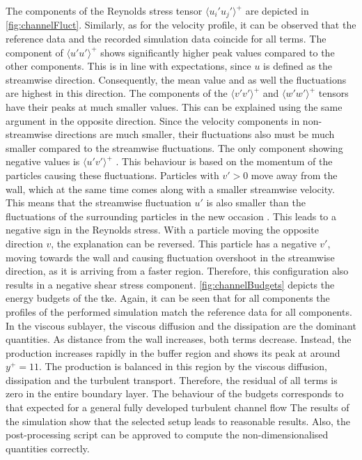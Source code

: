 The components of the Reynolds stress tensor $\langle u_i'u_j'\rangle ^+$ are depicted in \autoref{fig:channelFluct}.
Similarly, as for the velocity profile, it can be observed that the reference data and the recorded simulation data coincide for all terms.
The component of $\langle u'u'\rangle ^+$ shows  significantly higher peak values compared to the other components.
This is in line with expectations,  since $u$ is defined as the streamwise direction.
Consequently,  the mean value and as well the fluctuations are highest in this direction.
The components of the $\langle v'v'\rangle ^+$ and $\langle w'w'\rangle ^+$ tensors have their peaks at much smaller values.
%
This can be explained using the same argument in the opposite direction.
Since the velocity components in non-streamwise directions are much smaller, their fluctuations also must be much smaller compared to the streamwise fluctuations.
The only component showing negative values is $\langle u'v'\rangle ^+$  .
This behaviour is based on the momentum of the particles causing these fluctuations.
Particles with $v' > 0$ move away from the wall, which at the same time comes along with a smaller streamwise velocity. This means that the streamwise fluctuation $u'$ is also  smaller than the fluctuations of the surrounding particles in the new occasion .
This leads to a negative sign in the Reynolds stress.
With a particle moving the opposite direction $v$, the explanation can be reversed.
This particle has a negative $v'$, moving towards the wall and causing  fluctuation overshoot in the streamwise direction, as it is arriving from a faster region. 
Therefore, this configuration also results in a negative shear stress component.
\autoref{fig:channelBudgets} depicts the energy budgets of the \acrshort{tke}.
Again, it can be seen that for all components the profiles of the performed simulation match the reference data for all components.
In the viscous sublayer, the viscous diffusion and the dissipation are the dominant quantities.
As distance from the wall increases, both terms decrease.
Instead, the production increases rapidly in the buffer region and shows its peak at around $y ^+ = 11$.
The production is balanced in this region by the viscous diffusion, dissipation and the turbulent transport.
Therefore, the residual of all terms is zero in the entire boundary layer.
The behaviour of the budgets corresponds to that expected  for a general fully developed turbulent channel flow 
The results  of the simulation show that the selected setup leads to reasonable results.
Also, the post-processing script can be approved to compute the non-dimensionalised quantities correctly.



